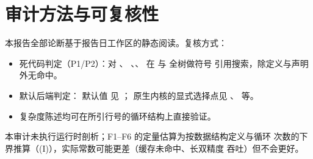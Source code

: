 \documentclass[11pt]{ctexart}
\begin{document}
\appendix
\section{审计方法与可复核性}
本报告全部论断基于报告日工作区的静态阅读。复核方式：
\begin{itemize}[leftmargin=2em]
\item 死代码判定（P1/P2）：对 、
、、
 在  与  全树做符号
引用搜索，除定义与声明外无命中。
\item 默认后端判定： 默认值
见 ；
原生内核的显式选择点见 、
 等。
\item 复杂度陈述均可在所引行号的循环结构上直接验证。
\end{itemize}
本审计未执行运行时剖析；F1--F6 的定量估算为按数据结构定义与循环
次数的下界推算（(I)），实际常数可能更差（缓存未命中、长双精度
吞吐）但不会更好。
\end{document}
